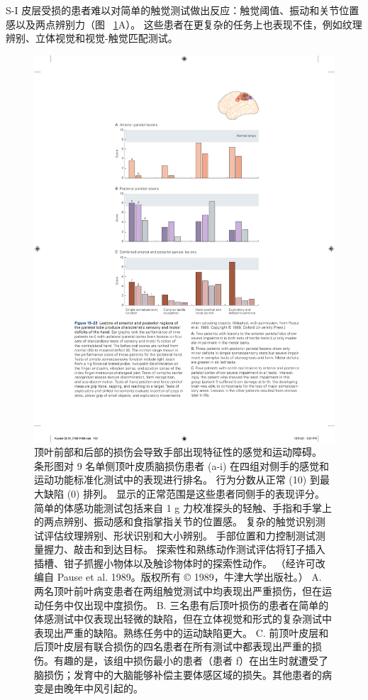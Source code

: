 S-I 皮层受损的患者难以对简单的触觉测试做出反应：触觉阈值、振动和关节位置感以及两点辨别力（图 ~\ref{fig:19_22}A）。
这些患者在更复杂的任务上也表现不佳，例如纹理辨别、立体视觉和视觉-触觉匹配测试。


\begin{figure}[htbp]
	\centering
	\includegraphics[width=0.7\linewidth]{chap19/fig_19_22}
	\caption{顶叶前部和后部的损伤会导致手部出现特征性的感觉和运动障碍。
		条形图对 9 名单侧顶叶皮质脑损伤患者 (a-i) 在四组对侧手的感觉和运动功能标准化测试中的表现进行排名。
		行为分数从正常 (10) 到最大缺陷 (0) 排列。
		显示的正常范围是这些患者同侧手的表现评分。
		简单的体感功能测试包括来自 1 g 力校准探头的轻触、手指和手掌上的两点辨别、振动感和食指掌指关节的位置感。
		复杂的触觉识别测试评估纹理辨别、形状识别和大小辨别。
		手部位置和力控制测试测量握力、敲击和到达目标。
		探索性和熟练动作测试评估将钉子插入插槽、钳子抓握小物体以及触诊物体时的探索性动作。 （经许可改编自 Pause et al. 1989。版权所有 © 1989，牛津大学出版社。）
		A. 两名顶叶前叶病变患者在两组触觉测试中均表现出严重损伤，但在运动任务中仅出现中度损伤。
		B. 三名患有后顶叶损伤的患者在简单的体感测试中仅表现出轻微的缺陷，但在立体视觉和形式的复杂测试中表现出严重的缺陷。熟练任务中的运动缺陷更大。
		C. 前顶叶皮层和后顶叶皮层有联合损伤的四名患者在所有测试中都表现出严重的损伤。有趣的是，该组中损伤最小的患者（患者 f）在出生时就遭受了脑损伤；发育中的大脑能够补偿主要体感区域的损失。其他患者的病变是由晚年中风引起的。}
	\label{fig:19_22}
\end{figure}


